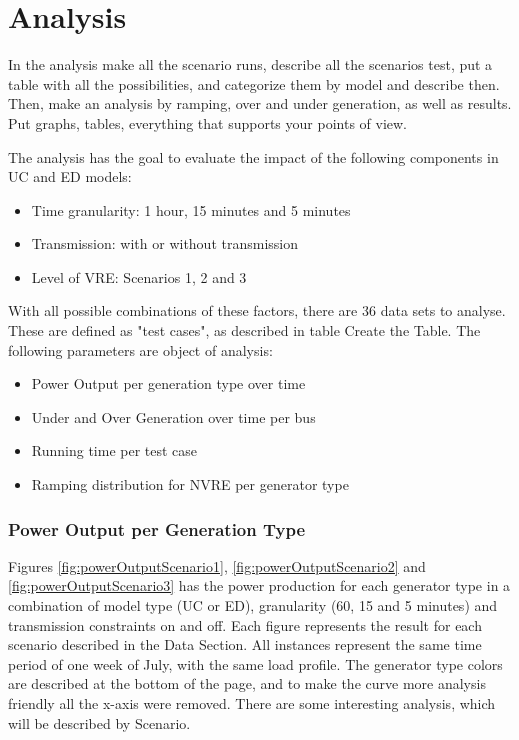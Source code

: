 \documentclass[12pt,LUDisStyle,twosided]{book}
\begin{document}
\chapter{Analysis}

In the analysis make all the scenario runs, describe all the scenarios test, put a table with all the possibilities, and categorize them by model and describe then. Then, make an analysis by ramping, over and under generation, as well as results. Put graphs, tables, everything that supports your points of view.

The analysis has the goal to evaluate the impact of the following components in UC and ED models:

\begin{itemize}
\item Time granularity: 1 hour, 15 minutes and 5 minutes
\item Transmission: with or without transmission
\item Level of VRE: Scenarios 1, 2 and 3
\end{itemize}

With all possible combinations of these factors, there are 36 data sets to analyse. These are defined as "test cases", as described in table Create the Table. The following parameters are object of analysis:

\begin{itemize}
\item Power Output per generation type over time
\item Under and Over Generation over time per bus
\item Running time per test case
\item Ramping distribution for NVRE per generator type
\end{itemize}

\subsection{Power Output per Generation Type}

Figures \ref{fig:powerOutputScenario1}, \ref{fig:powerOutputScenario2} and \ref{fig:powerOutputScenario3} has the power production for each generator type in a combination of model type (UC or ED), granularity (60, 15 and 5 minutes) and transmission constraints on and off. Each figure represents the result for each scenario described in the Data Section. All instances represent the same time period of one week of July, with the same load profile. The generator type colors are described at the bottom of the page, and to make the curve more analysis friendly all the x-axis were removed. There are some interesting analysis, which will be described by Scenario.
\end{document}
